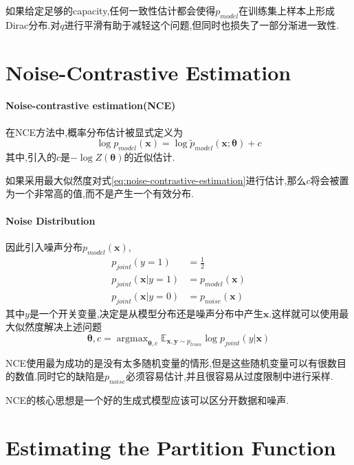 如果给定足够的capacity,任何一致性估计都会使得$p_{model}$在训练集上样本上形成Dirac分布.对$q$进行平滑有助于减轻这个问题,但同时也损失了一部分渐进一致性.

\section{Noise-Contrastive Estimation}

\paragraph{Noise-contrastive estimation(NCE)}在NCE方法中,概率分布估计被显式定义为
\begin{equation}\label{eq:noise-contrastive-estimation}
\log p_{model}(\bm x)=\log\tilde p_{model}(\bm x;\bm\theta)+c
\end{equation}
其中,引入的$c$是$-\log Z(\bm\theta)$的近似估计.

如果采用最大似然度对式\ref{eq:noise-contrastive-estimation}进行估计,那么$c$将会被置为一个非常高的值,而不是产生一个有效分布.

\paragraph{Noise Distribution}因此引入噪声分布$p_{model}(\bm x)$,
\begin{equation}\begin{split}
p_{joint}(y=1)&=\frac{1}{2}\\
p_{joint}(\bm x|y=1)&=p_{model}(\bm x)\\
p_{joint}(\bm x|y=0)&=p_{noise}(\bm x)
\end{split}\end{equation}
其中$y$是一个开关变量,决定是从模型分布还是噪声分布中产生$\bm x$.这样就可以使用最大似然度解决上述问题
\begin{equation}
\bm\theta,c=\mathop{\arg\max}_{\bm\theta,c}\mathbb E_{\bm{x,y}\sim p_{train}}\log p_{joint}(y|\bm x)
\end{equation}

NCE使用最为成功的是没有太多随机变量的情形,但是这些随机变量可以有很数目的数值.同时它的缺陷是$p_{noise}$必须容易估计,并且很容易从过度限制中进行采样.

NCE的核心思想是一个好的生成式模型应该可以区分开数据和噪声.

\section{Estimating the Partition Function}

